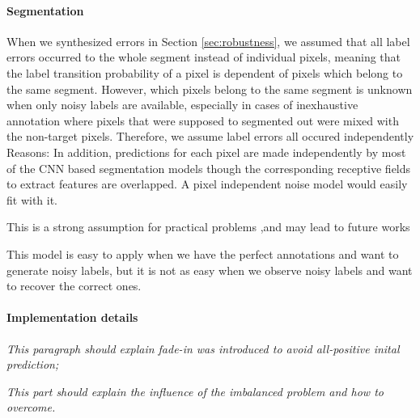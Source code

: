 \paragraph{Segmentation}
When we synthesized errors in Section \ref{sec:robustness}, we assumed that all label errors occurred to the whole segment instead of individual pixels, meaning that the label transition probability of a pixel is dependent of pixels which belong to the same segment.
However, which pixels belong to the same segment is unknown when only noisy labels are available, especially in cases of inexhaustive annotation where
pixels that were supposed to segmented out were mixed with the non-target pixels.
Therefore, we assume label errors all occured independently
Reasons:
In addition, predictions for each pixel are made independently by most of the CNN based segmentation models though the corresponding receptive fields to extract features are overlapped.
A pixel independent noise model would easily fit with it.

This is a strong assumption for practical problems
,and may lead to future works

This model is easy to apply when we have the perfect annotations and want to generate noisy labels, but it is not as easy when we observe noisy labels and want to recover the correct ones.


\paragraph{Implementation details}
\noindent \textit{This paragraph should explain fade-in was introduced to avoid all-positive inital prediction;}

\noindent

\noindent
\textit{This part should explain the influence of the imbalanced problem and how to overcome.}

